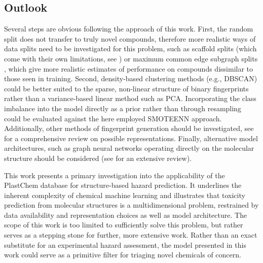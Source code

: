 \documentclass[hidelinks,11pt]{article}
\begin{document}
\subsection{Outlook}
Several steps are obvious following the approach of this work.
First, the random split does not transfer to truly novel compounds, therefore
more realistic ways of data splits need to be investigated for this problem, 
such as scaffold splits (which come with their own limitations, see \cite{kretschmerCoverageBiasSmall2025}) 
or maximum common edge subgraph splits \parencite{raymondRASCALCalculationGraph2002a}, which give 
more realistic estimates of performance on compounds dissimilar to those seen in training.
Second, density-based clustering methods (e.g., DBSCAN) could be better suited to the sparse, non-linear structure 
of binary fingerprints rather than a variance-based linear method such as PCA.
Incorporating the class imbalance into the model directly as a prior rather than through resampling could
be evaluated against the here employed SMOTEENN approach.
Additionally, other methods of fingerprint generation should be investigated, 
see \cite{huberCountYourBits2026a} for a comprehensive review on possible representations.
Finally, alternative model architectures, such as graph neural networks operating directly on the 
molecular structure should be considered (see \cite{atzGeometricDeepLearning2021} for an extensive review).

This work presents a primary investigation into the applicability of the PlastChem database for structure-based hazard prediction.
It underlines the inherent complexity of chemical machine learning and illustrates that toxicity prediction from molecular structures is 
a multidimensional problem, restrained by data availability and representation choices as well as model architecture.
The scope of this work is too limited to sufficiently solve this problem, but rather serves 
as a stepping stone for further, more extensive work.
Rather than an exact substitute for an experimental hazard assessment, the
model presented in this work could serve as a primitive filter for triaging novel chemicals of concern.

\newpage

\label{sec:Refs}
\printbibliography
\newpage
\listoftables

\listoffigures

\newpage




\appendix
\renewcommand{\thefigure}{\Alph{section}\arabic{figure}}
\setcounter{figure}{0}
\renewcommand{\thealgorithm}{\Alph{section}\arabic{algorithm}}
\setcounter{algorithm}{0}
\renewcommand{\thesection}{S\arabic{section}}  
\renewcommand{\thetable}{S\arabic{table}}  
\renewcommand{\thefigure}{S\arabic{figure}} 
\end{document}
